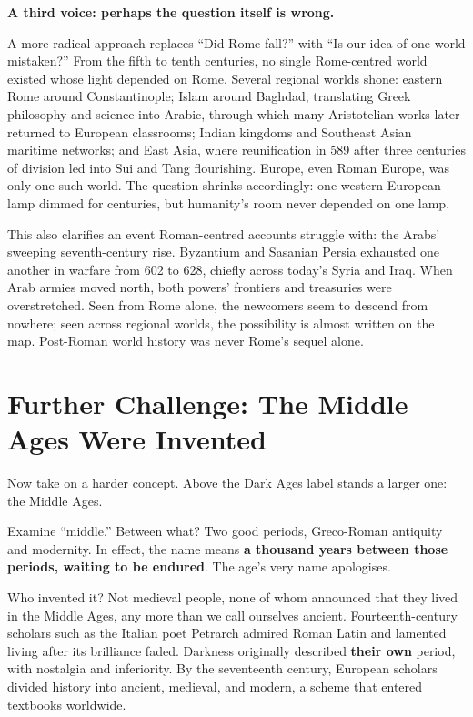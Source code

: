 \textbf{A third voice: perhaps the question itself is wrong.}

A more radical approach replaces ``Did Rome fall?'' with ``Is our idea of one world mistaken?'' From the fifth to tenth centuries, no single Rome-centred world existed whose light depended on Rome. Several regional worlds shone: eastern Rome around Constantinople; Islam around Baghdad, translating Greek philosophy and science into Arabic, through which many Aristotelian works later returned to European classrooms; Indian kingdoms and Southeast Asian maritime networks; and East Asia, where reunification in 589 after three centuries of division led into Sui and Tang flourishing. Europe, even Roman Europe, was only one such world. The question shrinks accordingly: one western European lamp dimmed for centuries, but humanity's room never depended on one lamp.

This also clarifies an event Roman-centred accounts struggle with: the Arabs' sweeping seventh-century rise. Byzantium and Sasanian Persia exhausted one another in warfare from 602 to 628, chiefly across today's Syria and Iraq. When Arab armies moved north, both powers' frontiers and treasuries were overstretched. Seen from Rome alone, the newcomers seem to descend from nowhere; seen across regional worlds, the possibility is almost written on the map. Post-Roman world history was never Rome's sequel alone.

\section[Further Challenge: Inventing the Middle Ages]{Further Challenge: The Middle Ages Were Invented}
Now take on a harder concept. Above the Dark Ages label stands a larger one: the Middle Ages.

Examine ``middle.'' Between what? Two good periods, Greco-Roman antiquity and modernity. In effect, the name means \textbf{a thousand years between those periods, waiting to be endured}. The age's very name apologises.

Who invented it? Not medieval people, none of whom announced that they lived in the Middle Ages, any more than we call ourselves ancient. Fourteenth-century scholars such as the Italian poet Petrarch admired Roman Latin and lamented living after its brilliance faded. Darkness originally described \textbf{their own} period, with nostalgia and inferiority. By the seventeenth century, European scholars divided history into ancient, medieval, and modern, a scheme that entered textbooks worldwide.

